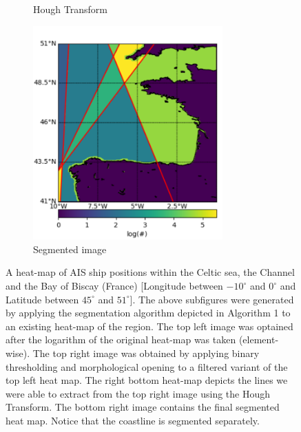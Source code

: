 \documentclass{article}
\begin{document}
\begin{figure}[ht]
\begin{subfigure}[b]{0.5\linewidth}
    \caption{Hough Transform} 
    \label{fig7:c} 
  \end{subfigure}%
  \begin{subfigure}[b]{0.5\linewidth}
    \centering
    \includegraphics[width=0.8\textwidth]{CELTICsegmented-crop.pdf} 
    \caption{Segmented image} 
    \label{fig7:d} 
  \end{subfigure} 
  \caption{A heat-map of AIS ship positions within the Celtic sea, the Channel and the Bay of Biscay (France) [Longitude between $-10^{\circ}$ and $0^{\circ}$ and Latitude between $45^{\circ}$ and $51^{\circ}$]. The above subfigures were generated by applying the segmentation algorithm depicted in Algorithm 1 to an existing heat-map of the region. The top left image was optained after the logarithm of the original heat-map was taken (element-wise). The top right image 
  was obtained by applying binary thresholding and morphological opening to a filtered variant of the top left heat map. The right bottom heat-map depicts the lines we were able to extract 
  from the top right image using the Hough Transform. The bottom right image contains the final segmented heat map. Notice that the coastline is segmented separately.}
  \label{fig7} 
\end{figure}
\end{document}
